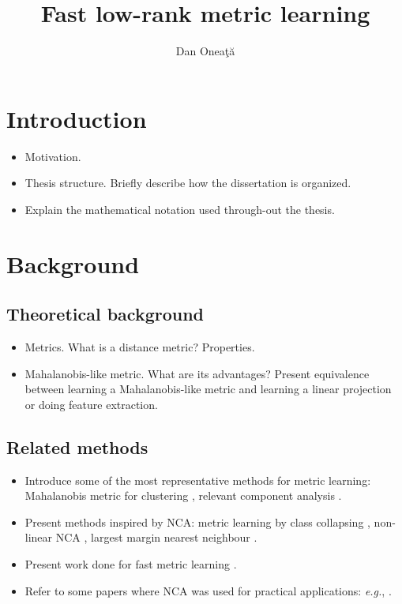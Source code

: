 \documentclass[11pt]{article} %
\title{Fast low-rank metric learning}
\author{Dan Onea\c{t}\u{a}}
\date{} %
\begin{document}
\maketitle

\section{Introduction}
	\begin{itemize}
		\item	Motivation.
		\item 	Thesis structure. Briefly describe how the dissertation is organized.
		\item 	Explain the mathematical notation used through-out the thesis.
	\end{itemize}

\section{Background}
	\subsection{Theoretical background}
		\begin{itemize}
			\item Metrics. What is a distance metric? Properties.
			\item Mahalanobis-like metric. What are its advantages? Present equivalence between learning a Mahalanobis-like metric and learning a linear projection or doing feature extraction.
			
		\end{itemize}
		
	\subsection{Related methods}
		\begin{itemize}
			\item Introduce some of the most representative methods for metric learning: Mahalanobis metric for clustering \citep{xing2003}, relevant component analysis \citep{shental2002}.
			\item Present methods inspired by NCA: metric learning by class collapsing \citep{globerson2006}, non-linear NCA \citep{salakhutdinov2007}, largest margin nearest neighbour \citep{weinberger2009}.
			\item Present work done for fast metric learning \citep{weinberger2007, weinberger2009}.
			\item Refer to some papers where NCA was used for practical applications: \textit{e.g.}, \citep{keller2006, singh2010}.
		\end{itemize}
		
\end{document}
